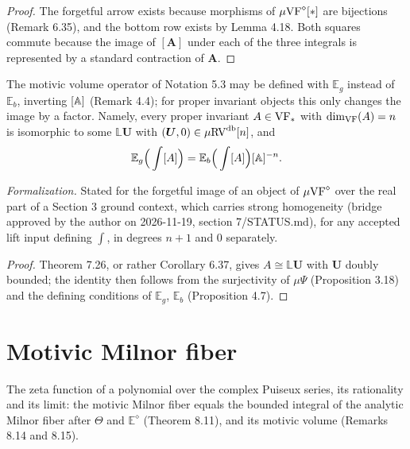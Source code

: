 \begin{proof}
\leanok
The forgetful arrow exists because morphisms of $\mu\mathrm{VF}^\diamond[*]$ are bijections (Remark 6.35), and the bottom row exists by Lemma 4.18. Both squares commute because the image of $[\boldsymbol{A}]$ under each of the three integrals is represented by a standard contraction of $\boldsymbol{A}$.
\end{proof}

\setcounter{theorem}{27}
\begin{remark}
\label{eg-eb-factor}
\leanok
{}
The motivic volume operator of Notation 5.3 may be defined with $\mathbb{E}_g$ instead of $\mathbb{E}_b$, inverting $[\mathbb{A}]$ (Remark 4.4); for proper invariant objects this only changes the image by a factor. Namely, every proper invariant $A \in \mathrm{VF}_*$ with $\dim_{\mathrm{VF}}(A) = n$ is isomorphic to some $\mathbb{L} \boldsymbol{U}$ with $(\boldsymbol{U}, 0) \in \mu\mathrm{RV}^{\operatorname{db}}[n]$, and\[ \mathbb{E}_g\Big(\int [A]\Big) = \mathbb{E}_b\Big(\int [A]\Big) [\mathbb{A}]^{-n}. \]

\emph{Formalization.} Stated for the forgetful image of an object of $\mu\mathrm{VF}^\diamond$ over the real part of a Section 3 ground context, which carries strong homogeneity (bridge approved by the author on 2026-11-19, section 7/STATUS.md), for any accepted lift input defining $\int$, in degrees $n + 1$ and $0$ separately.
\end{remark}

\begin{proof}
\leanok
Theorem 7.26, or rather Corollary 6.37, gives $A \cong \mathbb{L} \boldsymbol{U}$ with $\boldsymbol{U}$ doubly bounded; the identity then follows from the surjectivity of $\mu\Psi$ (Proposition 3.18) and the defining conditions of $\mathbb{E}_g$, $\mathbb{E}_b$ (Proposition 4.7).
\end{proof}

\section{Motivic Milnor fiber}
\label{section-8}
The zeta function of a polynomial over the complex Puiseux series, its rationality and its limit: the motivic Milnor fiber equals the bounded integral of the analytic Milnor fiber after $\Theta$ and $\mathbb{E}^{\diamond}$ (Theorem 8.11), and its motivic volume (Remarks 8.14 and 8.15).

